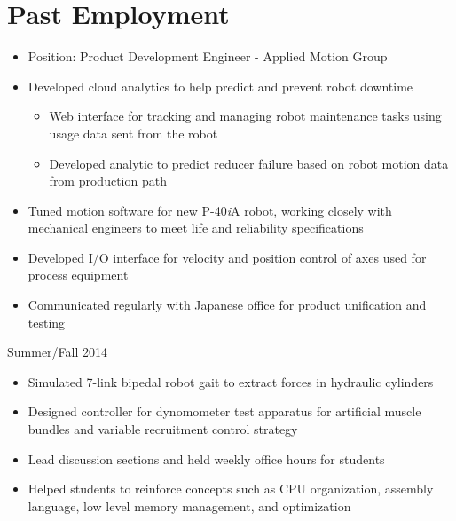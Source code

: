 \documentclass{BradyResume}
\begin{document}
\section*{Past Employment}
\begin{itemize}
  \item Position: Product Development Engineer - Applied Motion Group
  \item Developed cloud analytics to help predict and prevent robot downtime
  \begin{itemize}
    \item Web interface for tracking and managing robot maintenance tasks using usage data sent from the robot
    \item Developed analytic to predict reducer failure based on  robot motion data from production path
  \end{itemize}
  \item Tuned motion software for new P-40{\it{i}}A robot, working closely with mechanical engineers to meet life and reliability specifications
  \item Developed I/O interface for velocity and position control of axes used for process equipment
  \item Communicated regularly with Japanese office for product unification and testing

\end{itemize}
%
           {Summer/Fall 2014}
\begin{itemize}
  \item Simulated 7-link bipedal robot gait to extract forces in hydraulic cylinders
  \item Designed controller for dynomometer test apparatus for artificial muscle bundles and variable recruitment control strategy
\end{itemize}

\begin{itemize}
  \item Lead discussion sections and held weekly office hours for students
  \item Helped students to reinforce concepts such as CPU organization, assembly language, low level memory management, and optimization
\end{itemize}
\end{document}

